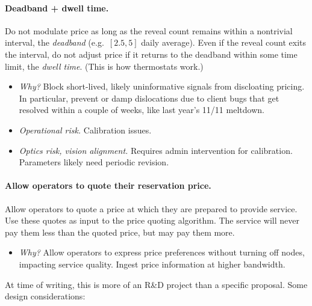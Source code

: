 \paragraph{Deadband + dwell time.}

Do not modulate price as long as the reveal count remains within a nontrivial interval, the \emph{deadband} (e.g.\ $[2.5,5]$ daily average). Even if the reveal count exits the interval, do not adjust price if it returns to the deadband within some time limit, the \emph{dwell time}. (This is how thermostats work.)

\begin{itemize}
  \item \emph{Why?} Block short-lived, likely uninformative signals from discloating pricing. In particular, prevent or damp dislocations due to client bugs that get resolved within a couple of weeks, like last year's 11/11 meltdown.
  \item \emph{Operational risk.} Calibration issues.
  \item \emph{Optics risk, vision alignment.} Requires admin intervention for calibration. Parameters likely need periodic revision.
\end{itemize}

\paragraph{Allow operators to quote their reservation price.}

Allow operators to quote a price at which they are prepared to provide service. Use these quotes as input to the price quoting algorithm. The service will never pay them less than the quoted price, but may pay them more.

\begin{itemize}
  \item \emph{Why?} Allow operators to express price preferences without turning off nodes, impacting service quality. Ingest price information at higher bandwidth.
\end{itemize}

At time of writing, this is more of an R\&D project than a specific proposal. Some design considerations:

